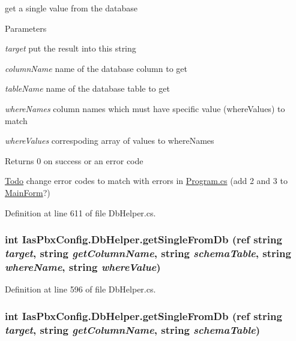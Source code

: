 get a single value from the database 
\begin{DoxyParams}{Parameters}
\item[{\em target}]put the result into this string \item[{\em columnName}]name of the database column to get \item[{\em tableName}]name of the database table to get \item[{\em whereNames}]column names which must have specific value (whereValues) to match \item[{\em whereValues}]correspoding array of values to whereNames \end{DoxyParams}
\begin{DoxyReturn}{Returns}
0 on success or an error code 
\end{DoxyReturn}
\begin{Desc}
\item[\hyperlink{todo__todo000019}{Todo}]change error codes to match with errors in \hyperlink{_program_8cs}{Program.cs} (add 2 and 3 to \hyperlink{class_ias_pbx_config_1_1_main_form}{MainForm}?) \end{Desc}


Definition at line 611 of file DbHelper.cs.\hypertarget{class_ias_pbx_config_1_1_db_helper_a8a20b88489b781ed779cf683a5005194}{
\subsubsection[{getSingleFromDb}]{\setlength{\rightskip}{0pt plus 5cm}int IasPbxConfig.DbHelper.getSingleFromDb (ref string {\em target}, \/  string {\em getColumnName}, \/  string {\em schemaTable}, \/  string {\em whereName}, \/  string {\em whereValue})}}
\label{class_ias_pbx_config_1_1_db_helper_a8a20b88489b781ed779cf683a5005194}


Definition at line 596 of file DbHelper.cs.\hypertarget{class_ias_pbx_config_1_1_db_helper_a07cb2de735cc96442d59ac4e3abd9ed5}{
\subsubsection[{getSingleFromDb}]{\setlength{\rightskip}{0pt plus 5cm}int IasPbxConfig.DbHelper.getSingleFromDb (ref string {\em target}, \/  string {\em getColumnName}, \/  string {\em schemaTable})}}
\label{class_ias_pbx_config_1_1_db_helper_a07cb2de735cc96442d59ac4e3abd9ed5}


